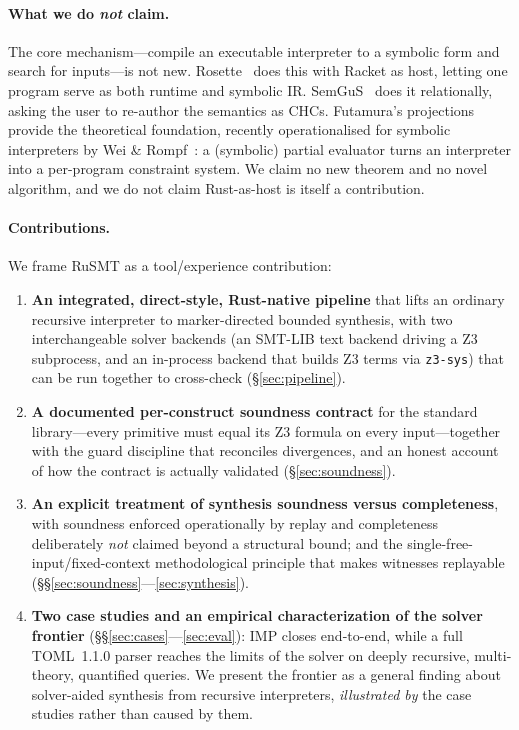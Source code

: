 \documentclass[11pt,a4paper]{article}
\theoremstyle{definition}
\theoremstyle{remark}
\newcommand{\rusmt}{RuSMT}
\newcommand{\imp}{IMP}
\newcommand{\toml}{TOML}
\newcommand{\code}[1]{\texttt{#1}}
\begin{document}
\paragraph{What we do \emph{not} claim.}
The core mechanism---compile an executable interpreter to a symbolic form and
search for inputs---is not new. Rosette~\cite{torlak2013rosette,torlak2014rosette}
does this with Racket as host, letting one program serve as both runtime and
symbolic IR. SemGuS~\cite{kim2021semgus} does it relationally, asking the user to
re-author the semantics as CHCs. Futamura's projections~\cite{futamura1999partial} provide the theoretical foundation, recently operationalised for symbolic interpreters by Wei \& 
Rompf~\cite{wei2020gensym}: a (symbolic) partial evaluator turns an interpreter into a per-program constraint system. We claim no new theorem and no novel algorithm, and we do not claim Rust-as-host is
itself a contribution.

\paragraph{Contributions.}
We frame \rusmt{} as a tool/experience contribution:
\begin{enumerate}[leftmargin=1.4em,itemsep=2pt]
\item \textbf{An integrated, direct-style, Rust-native pipeline} that lifts an ordinary
recursive interpreter to marker-directed bounded synthesis, with two
interchangeable solver backends (an SMT-LIB text backend driving a Z3
subprocess, and an in-process backend that builds Z3 terms via \code{z3-sys})
that can be run together to cross-check (\S\ref{sec:pipeline}).
\item \textbf{A documented per-construct soundness contract} for the standard
library---every primitive must equal its Z3 formula on every input---together
with the guard discipline that reconciles divergences, and an honest account of
how the contract is actually validated (\S\ref{sec:soundness}).
\item \textbf{An explicit treatment of synthesis soundness versus completeness},
with soundness enforced operationally by replay and completeness deliberately
\emph{not} claimed beyond a structural bound; and the
single-free-input/fixed-context methodological principle that makes witnesses
replayable (\S\S\ref{sec:soundness}---\ref{sec:synthesis}).
\item \textbf{Two case studies and an empirical characterization of the solver
frontier} (\S\S\ref{sec:cases}---\ref{sec:eval}): \imp{} closes end-to-end, while
a full \toml{}~1.1.0 parser reaches the limits of the solver on deeply recursive,
multi-theory, quantified queries. We present the frontier as a general finding
about solver-aided synthesis from recursive interpreters, \emph{illustrated by}
the case studies rather than caused by them.
\end{enumerate}
\end{document}
